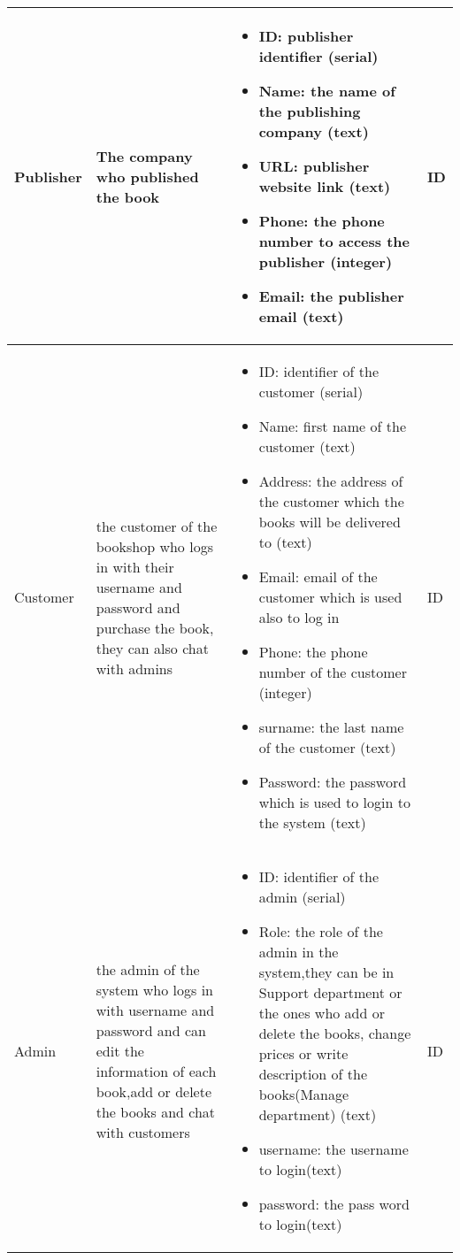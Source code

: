 \begin{longtable}{|p{}|p{} |p{}|p{} |}
 
   Publisher & The company who published the book & \begin{itemize}
        \vspace{-1em}
        \item ID: publisher identifier (serial)
        \item Name: the name of the publishing company (text)
        \item URL: publisher website link (text)
        \item Phone: the phone number to access the publisher (integer)
        \item Email: the publisher email (text)
    \end{itemize}
 &  ID \\\hline

  Customer & the customer of the bookshop who logs in with their username and password and purchase the book, they can also chat with admins & \begin{itemize}
        \vspace{-1em}
        \item ID: identifier of the customer (serial)
        \item Name: first name of the customer (text)
        \item Address: the address of the customer which the books will be delivered to (text)
        \item Email: email of the customer which is used also to log in
        \item Phone: the phone number of the customer (integer)
        \item surname: the last name of the customer (text)
        \item Password: the password which is used to login to the system (text)
    \end{itemize}
 &  ID \\\hline
 
   Admin & the admin of the system who logs in with username and password and can edit the information of each book,add or delete the books and chat with customers & \begin{itemize}
        \vspace{-1em}
        \item ID: identifier of the admin (serial)
        \item Role: the role of the admin in the system,they can be in Support department or the ones who add or delete the books, change prices or write description of the books(Manage department) (text)
        \item username: the username to login(text)
        \item password: the pass word to login(text)
    \end{itemize}
 &  ID \\\hline
 

\end{longtable}
